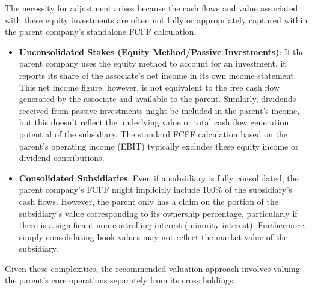 The necessity for adjustment arises because the cash flows and value associated with these equity investments are often not fully or appropriately captured within the parent company's standalone FCFF calculation.
\begin{itemize}
    \item \textbf{Unconsolidated Stakes (Equity Method/Passive Investments)}: If the parent company uses the equity method to account for an investment, it reports its share of the associate's net income in its own income statement. This net income figure, however, is not equivalent to the free cash flow generated by the associate and available to the parent. Similarly, dividends received from passive investments might be included in the parent's income, but this doesn't reflect the underlying value or total cash flow generation potential of the subsidiary. The standard FCFF calculation based on the parent's operating income (EBIT) typically excludes these equity income or dividend contributions.
    \item \textbf{Consolidated Subsidiaries}: Even if a subsidiary is fully consolidated, the parent company's FCFF might implicitly include 100\% of the subsidiary's cash flows. However, the parent only has a claim on the portion of the subsidiary's value corresponding to its ownership percentage, particularly if there is a significant non-controlling interest (minority interest). Furthermore, simply consolidating book values may not reflect the market value of the subsidiary.
\end{itemize}

Given these complexities, the recommended valuation approach \parencite{damodaran_cash_and_other, koller2020valuation} involves valuing the parent's core operations separately from its cross holdings:

